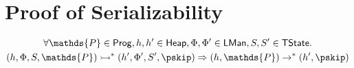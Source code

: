 \section{Proof of Serializability}

\begin{gather*}
\forall \mathds{P} \in \mathsf{Prog}, h, h' \in \mathsf{Heap}, \Phi, \Phi' \in \mathsf{LMan}, S, S' \in \mathsf{TState} \ldotp \\ (h, \Phi, S, \mathds{P}) \rightarrowtail^* (h', \Phi', S', \pskip) \Rightarrow (h, \mathds{P}) \rightarrow^* (h', \pskip)
\end{gather*}